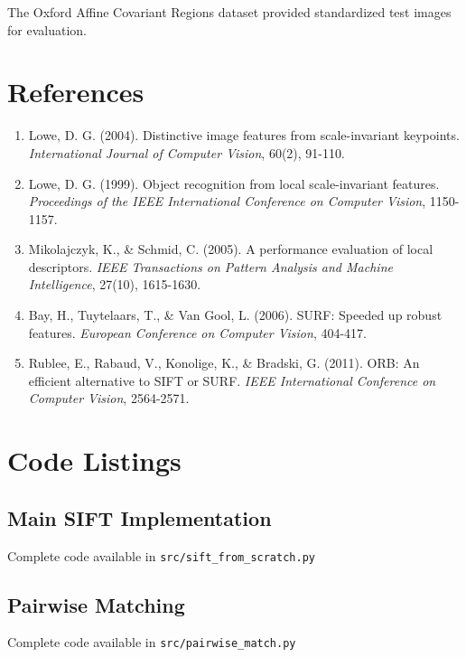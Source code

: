\documentclass[12pt,a4paper]{article}
\begin{document}
The Oxford Affine Covariant Regions dataset provided standardized test images for evaluation.

\section*{References}

\begin{enumerate}
    \item Lowe, D. G. (2004). Distinctive image features from scale-invariant keypoints. \textit{International Journal of Computer Vision}, 60(2), 91-110.
    
    \item Lowe, D. G. (1999). Object recognition from local scale-invariant features. \textit{Proceedings of the IEEE International Conference on Computer Vision}, 1150-1157.
    
    \item Mikolajczyk, K., \& Schmid, C. (2005). A performance evaluation of local descriptors. \textit{IEEE Transactions on Pattern Analysis and Machine Intelligence}, 27(10), 1615-1630.
    
    \item Bay, H., Tuytelaars, T., \& Van Gool, L. (2006). SURF: Speeded up robust features. \textit{European Conference on Computer Vision}, 404-417.
    
    \item Rublee, E., Rabaud, V., Konolige, K., \& Bradski, G. (2011). ORB: An efficient alternative to SIFT or SURF. \textit{IEEE International Conference on Computer Vision}, 2564-2571.
\end{enumerate}

\appendix

\section{Code Listings}

\subsection{Main SIFT Implementation}
Complete code available in \texttt{src/sift\_from\_scratch.py}

\subsection{Pairwise Matching}
Complete code available in \texttt{src/pairwise\_match.py}
\end{document}
